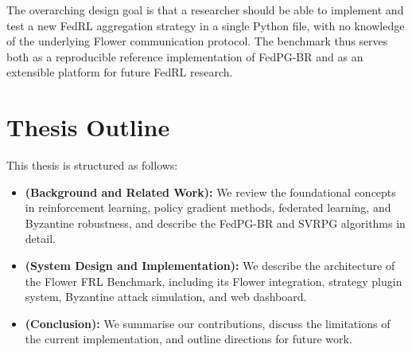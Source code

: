 The overarching design goal is that a researcher should be able to implement and
test a new FedRL aggregation strategy in a single Python file, with no knowledge
of the underlying Flower communication protocol. The benchmark thus serves both
as a reproducible reference implementation of FedPG-BR and as an extensible
platform for future FedRL research.

\section*{Thesis Outline}

This thesis is structured as follows:

\begin{itemize}
    \item \textbf{ (Background and Related Work):} We review
          the foundational concepts in reinforcement learning, policy gradient
          methods, federated learning, and Byzantine robustness, and describe the
          FedPG-BR and SVRPG algorithms in detail.
    \item \textbf{ (System Design and Implementation):} We
          describe the architecture of the Flower FRL Benchmark, including its
          Flower integration, strategy plugin system, Byzantine attack simulation,
          and web dashboard.
    \item \textbf{ (Conclusion):} We summarise our
          contributions, discuss the limitations of the current implementation,
          and outline directions for future work.
\end{itemize}

